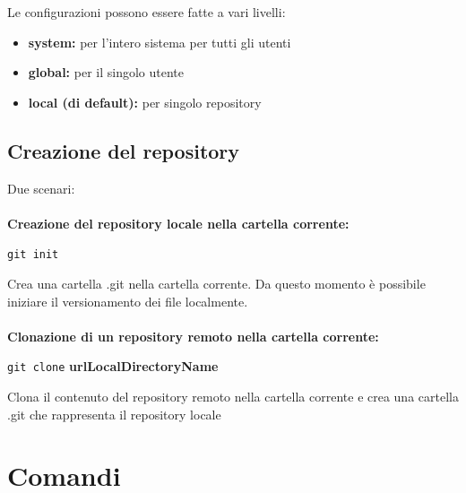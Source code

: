 \documentclass[12pt, a4paper]{article}
\begin{document}
Le configurazioni possono essere fatte a vari livelli:
\begin{center}
    \begin{itemize}
        \item \textbf{system:} per l’intero sistema per tutti gli utenti
        \item \textbf{global:} per il singolo utente
        \item \textbf{local (di default):} per singolo repository
    \end{itemize}
\end{center}

\subsection{Creazione del repository}
Due scenari:\\\\
\textbf{Creazione del repository locale nella cartella corrente:}
\begin{center}
    \texttt{git init}
\end{center}
Crea una cartella .git nella cartella corrente. Da questo momento è possibile iniziare il versionamento dei file localmente.\\\\
\textbf{Clonazione di un repository remoto nella cartella corrente:}
\begin{center}
    \texttt{git clone} \textbf{urlLocalDirectoryName}
\end{center}
Clona il contenuto del repository remoto nella cartella corrente e crea una cartella .git che rappresenta il repository locale

\clearpage

\section{Comandi}
\end{document}
